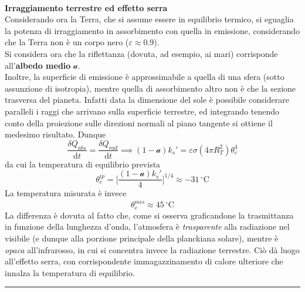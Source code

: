 \documentclass[10pt, oneside]{book}
\newcommand{\celsius}{\, \mathrm{{}^\circ C}}
\newcommand{\infobox}[2]{\vspace{0.5cm}~\\ \textbf{#1} \hrulefill \vspace{0.2cm}\\#2 {}\,\\\hrule \vspace{0.5cm}}
\begin{document}
\infobox{Irraggiamento terrestre ed effetto serra}{Considerando ora la Terra, che si assume essere in equilibrio termico, si eguaglia la potenza di irraggiamento in assorbimento con quella in emissione, considerando che la Terra non è un corpo nero ($\varepsilon \approx 0.9$).\\
Si considera ora che la riflettanza (dovuta, ad esempio, ai mari) corrisponde all'\textbf{albedo medio} $\mathcal{a}$.\\
Inoltre, la superficie di emissione è approssimabile a quella di una sfera (sotto assunzione di isotropia), mentre quella di assorbimento altro non è che la sezione trasversa del pianeta. Infatti data la dimensione del sole è possibile considerare paralleli i raggi che arrivano sulla superficie terrestre, ed integrando tenendo conto della proiezione sulle direzioni normali al piano tangente si ottiene il medesimo risultato. Dunque
\[\frac{\delta Q_{abs}}{\mathrm{d} t} = \frac{\delta Q_{rad}}{\mathrm{d} t} \implies (1 - \mathcal{a}) k_s' = \varepsilon \sigma (4 \pi R_T^2) \theta_e^4\]
da cui la temperatura di equilibrio prevista
\[\theta_e^{ip}= \bigg[\frac{(1 -\mathcal{a}) k_s'}{4 }\bigg]^{1/4} \approx - 31 \celsius\]
La temperatura misurata è invece
\[\theta_e^{mis} \approx 45 \celsius\]
La differenza è dovuta al fatto che, come si osserva graficandone la trasmittanza in funzione della lunghezza d'onda, l'atmosfera è \textit{trasparente} alla radiazione nel visibile (e dunque alla porzione principale della planckiana solare), mentre è \textit{opaca} all'infrarosso, in cui si concentra invece la radiazione terrestre. Ciò dà luogo all'effetto serra, con corrispondente immagazzinamento di calore ulteriore che innalza la temperatura di equilibrio.
}
\end{document}
